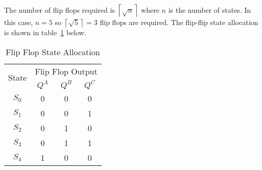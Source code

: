 The number of flip flops required is $\left \lceil{\sqrt{n}}\right \rceil $ where $n$ is the number of states. In this case, $n=5$ so $\left \lceil{\sqrt{5}}\right \rceil =3$ flip flops are required. The flip-flip state allocation is shown in table~\ref{tab:Q14} below.


\begin{table}[ht!]
    \centering
    \begin{tabular}{|c||ccc|}
        \hline
        \multirow{2}{*}{State} & \multicolumn{3}{c|}{Flip Flop Output}                           \\ \cline{2-4} 
                               & \multicolumn{1}{c|}{$Q^A$} & \multicolumn{1}{c|}{$Q^B$} & $Q^C$ \\ \hhline{|=||=|=|=|} 
        $S_0$                  & \multicolumn{1}{c|}{0}     & \multicolumn{1}{c|}{0}     & 0     \\ \hline
        $S_1$                  & \multicolumn{1}{c|}{0}     & \multicolumn{1}{c|}{0}     & 1     \\ \hline
        $S_2$                  & \multicolumn{1}{c|}{0}     & \multicolumn{1}{c|}{1}     & 0     \\ \hline
        $S_3$                  & \multicolumn{1}{c|}{0}     & \multicolumn{1}{c|}{1}     & 1     \\ \hline
        $S_4$                  & \multicolumn{1}{c|}{1}     & \multicolumn{1}{c|}{0}     & 0     \\ \hline
        \end{tabular}
    \caption{Flip Flop State Allocation}\label{tab:Q14}
    \end{table}

 